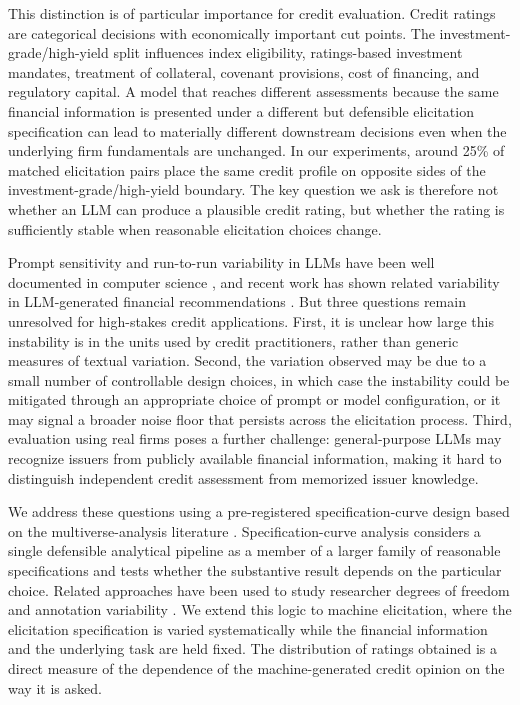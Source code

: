 \documentclass[pdflatex,sn-nature,lineno]{sn-jnl}
\theoremstyle{thmstyleone}
\begin{document}
This distinction is of particular importance for credit evaluation. Credit ratings are categorical
decisions with economically important cut points. The investment-grade/high-yield split influences index
eligibility, ratings-based investment mandates, treatment of collateral, covenant provisions, cost of
financing, and regulatory capital. A model that reaches different assessments because the same financial
information is presented under a different but defensible elicitation specification can lead to materially
different downstream decisions even when the underlying firm fundamentals are unchanged. In our
experiments, around 25\% of matched elicitation pairs place the same credit profile on opposite sides of
the investment-grade/high-yield boundary. The key question we ask is therefore not whether an LLM can
produce a plausible credit rating, but whether the rating is sufficiently stable when reasonable
elicitation choices change.

Prompt sensitivity and run-to-run variability in LLMs have been well documented in computer science
\cite{atil2024nondeterminism,kaplan2020scaling}, and recent work has shown related variability in
LLM-generated financial recommendations \cite{chon2025variability}. But three questions remain
unresolved for high-stakes credit applications. First, it is unclear how large this
instability is in the units used by credit practitioners, rather than generic measures of textual
variation. Second, the variation observed may be due to a small number of controllable design choices,
in which case the instability could be mitigated through an appropriate choice of prompt or model
configuration, or it may signal a broader noise floor that persists across the elicitation process. Third,
evaluation using real firms poses a further challenge: general-purpose LLMs may recognize issuers from
publicly available financial information, making it hard to distinguish independent credit assessment
from memorized issuer knowledge.

We address these questions using a pre-registered specification-curve design based on the
multiverse-analysis literature \cite{simonsohn2020specification,steegen2016multiverse}.
Specification-curve analysis considers a single defensible analytical pipeline as a member of a larger
family of reasonable specifications and tests whether the substantive result depends on the particular
choice. Related approaches have been used to study researcher degrees of freedom and annotation
variability \cite{camuffo2026variance}. We extend this logic to machine elicitation, where the
elicitation specification is varied systematically while the financial information and the underlying
task are held fixed. The distribution of ratings obtained is a direct measure of the dependence of the
machine-generated credit opinion on the way it is asked.
\end{document}
